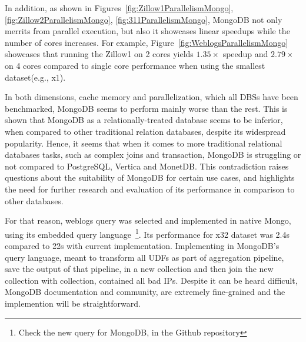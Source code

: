 In addition, as shown in Figures~\ref{fig:Zillow1ParallelismMongo}, 
\ref{fig:Zillow2ParallelismMongo}, \ref{fig:311ParallelismMongo}, 
MongoDB not only merrits from parallel execution, but also it showcases 
linear speedups while the number of cores increases.
For example, Figure~\ref{fig:WeblogsParallelismMongo} showcases that running 
the Zillow1 on 2 cores yields $1.35\times$ speedup 
and $2.79\times$ on 4 cores compared to single core performance when using the smallest dataset(e.g., x1).

In both dimensions, cache memory and parallelization, which all DBSs have been 
benchmarked, MongoDB seems to perform mainly worse than the rest. This is 
shown that MongoDB as a relationally-treated database seems to be inferior, 
when compared to other traditional relation databases, despite its widespread
popularity. Hence, it seems that when it comes to more
traditional relational databases tasks, such as complex joins and transaction, 
MongoDB is struggling or not compared to PostgreSQL, Vertica and MonetDB. 
This contradiction raises questions about the suitability of MongoDB for certain use cases, 
and highlights the need for further research and evaluation of its performance in comparison 
to other databases. 

For that reason, weblogs query was selected and implemented in native Mongo, using its 
embedded query language~\footnote{Check the new query for MongoDB, in the Github repository}.
Its performance for x32 dataset was 2.4s compared to 22s
with current implementation. Implementing in MongoDB's query language, meant to transform 
all UDFs as part of aggregation pipeline, save the output of that pipeline, in a new
collection and then join the new collection with collection, contained all bad IPs. 
Despite it can be heard difficult, MongoDB documentation and community, are 
extremely fine-grained and the implemention will be straightforward. 


